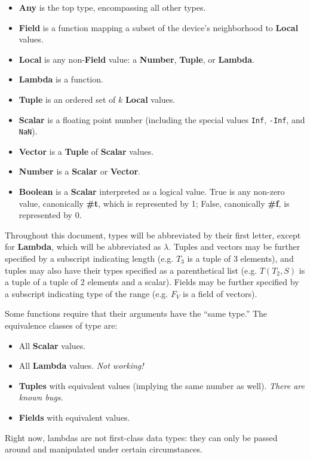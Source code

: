 \documentclass{article}
\newcommand\broken{{\em Not working!}}
\newcommand\bugs{{\em There are known bugs.}}
\newcommand\type[1]{$#1$}
\begin{document}
\begin{itemize}
\item {\bf Any} is the top type, encompassing all other types.
\item {\bf Field} is a function mapping a subset of the device's
  neighborhood to {\bf Local} values.
\item {\bf Local} is any non-{\bf Field} value: a {\bf Number}, 
  {\bf Tuple}, or {\bf Lambda}.
\item {\bf Lambda} is a function.
\item {\bf Tuple} is an ordered set of $k$ {\bf Local} values.
\item {\bf Scalar} is a floating point number (including the special
  values {\tt Inf}, {\tt -Inf}, and {\tt NaN}).
\item {\bf Vector} is a {\bf Tuple} of {\bf Scalar} values.
\item {\bf Number} is a {\bf Scalar} or {\bf Vector}.
\item {\bf Boolean} is a {\bf Scalar} interpreted as a logical value.
  True is any non-zero value, canonically {\bf \#t}, which is
  represented by 1; False, canonically {\bf \#f}, is represented by 0.
\end{itemize}

Throughout this document, types will be abbreviated by their first
letter, except for {\bf Lambda}, which will be abbreviated as
$\lambda$.  Tuples and vectors may be further specified by a subscript
indicating length (e.g. \type{T_3} is a tuple of 3 elements), and
tuples may also have their types specified as a parenthetical list
(e.g. \type{T(T_2,S)} is a tuple of a tuple of 2 elements and a
scalar).  Fields may be further specified by a subscript indicating
type of the range (e.g. \type{F_V} is a field of vectors).

Some functions require that their arguments have the ``same type.''
The equivalence classes of type are:
\begin{itemize}
\item All {\bf Scalar} values.
\item All {\bf Lambda} values. \broken{}
\item {\bf Tuples} with equivalent values (implying the same number as
  well). \bugs{}
\item {\bf Fields} with equivalent values.
\end{itemize}

Right now, lambdas are not first-class data types: they can only be
passed around and manipulated under certain circumstances.
\end{document}
